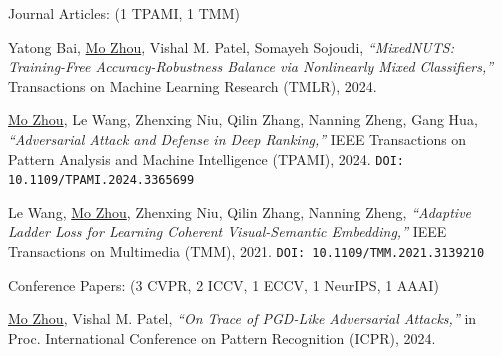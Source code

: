 \documentclass[10pt,margin,line,pifont,palatino,courier]{res}
\begin{document}
\begin{resume}
{\sc Journal Articles:} \hfill(1 TPAMI, 1 TMM)\\

\begin{enumerate}[noitemsep, leftmargin=*, label={[J0{\arabic*}]}]

\item Yatong Bai, \underline{Mo Zhou}, Vishal M. Patel, Somayeh Sojoudi,
\reversemarginpar{}
\textit{``MixedNUTS: Training-Free Accuracy-Robustness Balance via Nonlinearly Mixed Classifiers,''}
Transactions on Machine Learning Research (TMLR), 2024.

\item \underline{Mo Zhou},
\reversemarginpar{}
Le Wang, Zhenxing Niu, Qilin Zhang, Nanning Zheng, Gang Hua,
\textit{``Adversarial Attack and Defense in Deep Ranking,''}
IEEE Transactions on Pattern Analysis and Machine Intelligence (TPAMI), 2024.
\texttt{\small DOI: 10.1109/TPAMI.2024.3365699}

\item Le Wang, \underline{Mo Zhou},
\reversemarginpar{}
Zhenxing Niu, Qilin Zhang, Nanning Zheng,
\textit{``Adaptive Ladder Loss for Learning Coherent Visual-Semantic Embedding,''}
IEEE Transactions on Multimedia (TMM), 2021.
\texttt{\small DOI: 10.1109/TMM.2021.3139210}

\end{enumerate}

	{\sc Conference Papers:}\hfill
	(3 CVPR, 2 ICCV, 1 ECCV, 1 NeurIPS, 1 AAAI)\\

\begin{enumerate}[noitemsep, leftmargin=*, label={[C0{\arabic*}]}]

\item \underline{Mo Zhou}, Vishal M. Patel,
\reversemarginpar{}
\textit{``On Trace of PGD-Like Adversarial Attacks,''}
in Proc. International Conference on Pattern Recognition (ICPR), 2024.


\end{enumerate}
\end{resume}
\end{document}
